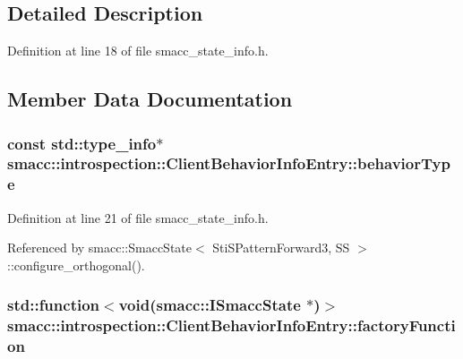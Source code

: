 \subsection{Detailed Description}


Definition at line 18 of file smacc\+\_\+state\+\_\+info.\+h.



\subsection{Member Data Documentation}
\subsubsection[{\texorpdfstring{behavior\+Type}{behaviorType}}]{\setlength{\rightskip}{0pt plus 5cm}const std\+::type\+\_\+info$\ast$ smacc\+::introspection\+::\+Client\+Behavior\+Info\+Entry\+::behavior\+Type}\hypertarget{structsmacc_1_1introspection_1_1ClientBehaviorInfoEntry_a11156213a771b7801ae69698de326e44}{}\label{structsmacc_1_1introspection_1_1ClientBehaviorInfoEntry_a11156213a771b7801ae69698de326e44}


Definition at line 21 of file smacc\+\_\+state\+\_\+info.\+h.



Referenced by smacc\+::\+Smacc\+State$<$ Sti\+S\+Pattern\+Forward3, S\+S $>$\+::configure\+\_\+orthogonal().

\subsubsection[{\texorpdfstring{factory\+Function}{factoryFunction}}]{\setlength{\rightskip}{0pt plus 5cm}std\+::function$<$void({\bf smacc\+::\+I\+Smacc\+State} $\ast$)$>$ smacc\+::introspection\+::\+Client\+Behavior\+Info\+Entry\+::factory\+Function}\hypertarget{structsmacc_1_1introspection_1_1ClientBehaviorInfoEntry_abb0863623802e0107c659e61931518f4}{}\label{structsmacc_1_1introspection_1_1ClientBehaviorInfoEntry_abb0863623802e0107c659e61931518f4}


